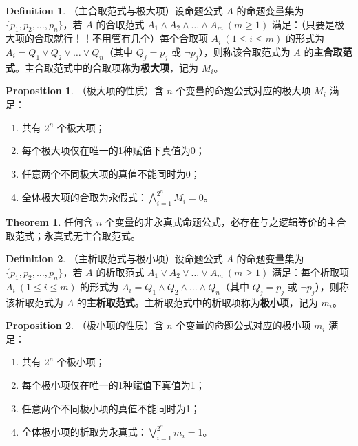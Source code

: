\documentclass[oneside]{book}
\theoremstyle{definition}
\newtheorem{proposition}{Proposition}[section]
\newtheorem{definition}{Definition}[section]
\newtheorem{theorem}{Theorem}[section]
\begin{document}
\begin{definition}
	（主合取范式与极大项）设命题公式 \( A \) 的命题变量集为 \( \{p_1, p_2, \dots, p_n\} \)，若 \( A \) 的合取范式 \( A_1 \land A_2 \land \dots \land A_m \ (m \geq 1) \) 满足：（只要是极大项的合取就行！！不用管有几个）每个合取项 \( A_i \ (1 \leq i \leq m) \) 的形式为 \( A_i = Q_1 \lor Q_2 \lor \dots \lor Q_n \)（其中 \( Q_j = p_j \) 或 \( \lnot p_j \)），则称该合取范式为 \( A \) 的\textbf{主合取范式}。主合取范式中的合取项称为\textbf{极大项}，记为 \( M_i \)。
\end{definition}

\begin{proposition}
	（极大项的性质）含 \( n \) 个变量的命题公式对应的极大项 \( M_i \) 满足：
	\begin{enumerate}
		\item 共有 \( 2^n \) 个极大项；
		\item 每个极大项仅在唯一的1种赋值下真值为0；
		\item 任意两个不同极大项的真值不能同时为0；
		\item 全体极大项的合取为永假式：\( \bigwedge_{i=1}^{2^n} M_i = 0 \)。
	\end{enumerate}
\end{proposition}

\begin{theorem}
	任何含 \( n \) 个变量的非永真式命题公式，必存在与之逻辑等价的主合取范式；永真式无主合取范式。
\end{theorem}

\begin{definition}
	（主析取范式与极小项）设命题公式 \( A \) 的命题变量集为 \( \{p_1, p_2, \dots, p_n\} \)，若 \( A \) 的析取范式 \( A_1 \lor A_2 \lor \dots \lor A_m \ (m \geq 1) \) 满足：每个析取项 \( A_i \ (1 \leq i \leq m) \) 的形式为 \( A_i = Q_1 \land Q_2 \land \dots \land Q_n \)（其中 \( Q_j = p_j \) 或 \( \lnot p_j \)），则称该析取范式为 \( A \) 的\textbf{主析取范式}。主析取范式中的析取项称为\textbf{极小项}，记为 \( m_i \)。
\end{definition}

\begin{proposition}
	（极小项的性质）含 \( n \) 个变量的命题公式对应的极小项 \( m_i \) 满足：
	\begin{enumerate}
		\item 共有 \( 2^n \) 个极小项；
		\item 每个极小项仅在唯一的1种赋值下真值为1；
		\item 任意两个不同极小项的真值不能同时为1；
		\item 全体极小项的析取为永真式：\( \bigvee_{i=1}^{2^n} m_i = 1 \)。
	\end{enumerate}
\end{proposition}
\end{document}
